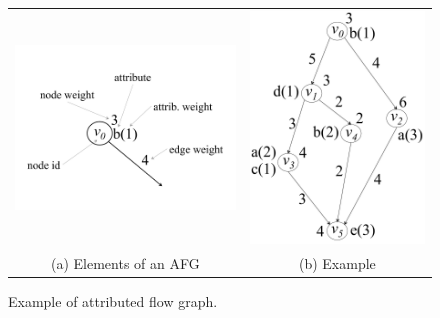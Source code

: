 \begin{figure}[htp]
\centering
\begin{tabular}{cc}
  \includegraphics[scale=0.15]{figures/attributed_flow_graph_descpr.pdf} &
  \includegraphics[scale=0.15]{figures/attributed_flow_graph3.pdf}\\
  (a) Elements of an AFG & (b) Example
\end{tabular}
    \caption{Example of attributed flow graph.}
    \label{fig:AFG}  
\end{figure}

